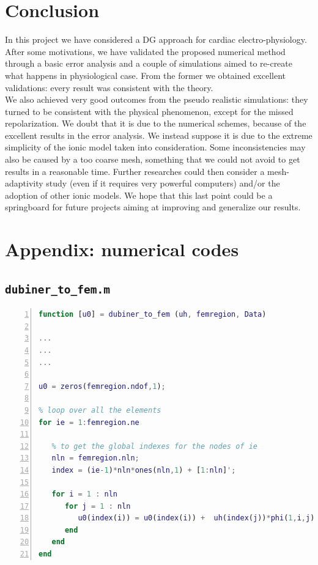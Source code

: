 \documentclass[a4paper,11pt]{article}
\begin{document}
\section{Conclusion}
In this project we have considered a DG approach for cardiac electro-physiology. After some motivations, we have validated the proposed numerical method through a basic error analysis and a couple of simulations aimed to re-create what happens in physiological case.
\noindent From the former we obtained excellent validations: every result was consistent with the theory.\\
\noindent We also achieved very good outcomes from the pseudo realistic simulations: they turned to be consistent with the physical phenomenon, except for the missed repolarization. We doubt that it is due to the numerical schemes, because of the excellent results in the error analysis. We instead suppose it is due to the extreme simplicity of the ionic model taken into consideration. Some inconsistencies may also be caused by a too coarse mesh, something that we could not avoid to get results in a reasonable time. Further researches could then consider a mesh-adaptivity study (even if it requires very powerful computers) and/or the adoption of other ionic models.
\noindent We hope that this last point could be a springboard for future projects aiming at improving and generalize our results.  
\newpage
\section{Appendix: numerical codes}
\subsection{\texttt{dubiner\_to\_fem.m}}\label{dub_to_fem}
\begin{lstlisting}[language=Matlab,basicstyle=\small, numbers=left, numberstyle=\tiny,  name = dubiner_to_fem.m, frame=single]
function [u0] = dubiner_to_fem (uh, femregion, Data)  
	
...
...
...
	
u0 = zeros(femregion.ndof,1);
	
% loop over all the elements
for ie = 1:femregion.ne
	
   % to get the global indexes for the nodes of ie 
   nln = femregion.nln;
   index = (ie-1)*nln*ones(nln,1) + [1:nln]';
	
   for i = 1 : nln
      for j = 1 : nln
         u0(index(i)) = u0(index(i)) +  uh(index(j))*phi(1,i,j);
      end
   end
end
\end{lstlisting} 
\end{document}
